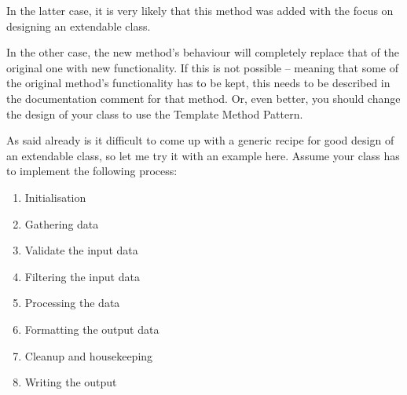 In the latter case, it is very likely that this method was added with the focus on designing an extendable class.

In the other case, the new method's behaviour will completely replace that of the original one with new functionality. If this is not possible – meaning that some of the original method's functionality has to be kept, this needs to be described in the documentation comment for that method. Or, even better, you should change the design of your class to use the Template Method Pattern\autocite{Gamma:DesignPatterns}.

As said already is it difficult to come up with a generic recipe for good design of an extendable class, so let me try it with an example here. Assume your class has to implement the following process:
\begin{enumerate}
\item{Initialisation}
\item{Gathering data}
\item{Validate the input data}
\item{Filtering the input data}
\item{Processing the data}
\item{Formatting the output data}
\item{Cleanup and housekeeping}
\item{Writing the output}
\end{enumerate}

